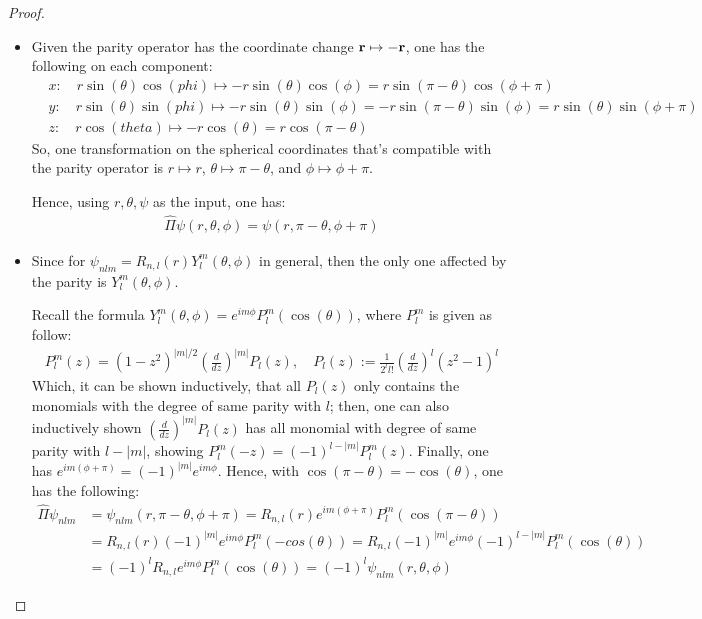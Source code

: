 \documentclass{article}
\begin{document}
\begin{proof}
    
    \hfil

    \begin{itemize}
        \item[(a)] Given the parity operator has the coordinate change $\mathbf{r} \mapsto -\mathbf{r}$, one has the following on each component:
        \begin{align}
            &x: \quad r\sin(\theta)\cos(phi) \mapsto -r\sin(\theta)\cos(\phi) = r\sin(\pi-\theta)\cos(\phi+\pi)\\
            &y: \quad r\sin(\theta)\sin(phi) \mapsto -r\sin(\theta)\sin(\phi) = -r\sin(\pi-\theta)\sin(\phi) = r\sin(\theta)\sin(\phi+\pi)\\
            &z:\quad r\cos(theta) \mapsto -r\cos(\theta) = r\cos(\pi-\theta)
        \end{align}
        So, one transformation on the spherical coordinates that's compatible with the parity operator is $r\mapsto r$, $\theta\mapsto \pi-\theta$, and $\phi\mapsto \phi+\pi$.

        Hence, using $r,\theta,\psi$ as the input, one has:
        \begin{align}
            \hat{\Pi}\psi(r,\theta,\phi) = \psi(r,\pi-\theta, \phi+\pi)
        \end{align}

        \hfil

        \item[(b)] Since for $\psi_{nlm} = R_{n,l} (r) Y^m_l (\theta,\phi)$ in general, then the only one affected by the parity is $Y^m_l(\theta,\phi)$. 
        
        Recall the formula $Y^m_l(\theta,\phi) = e^{im\phi}P^m_l (\cos(\theta))$, where $P^m_l$ is given as follow:
        \begin{align}
            P^m_l (z)=(1-z^2)^{|m|/2}\left(\frac{d}{dz}\right)^{|m|}P_l (z), \quad P_l (z) := \frac{1}{2^l l!}\left(\frac{d}{dz}\right)^l (z^2-1)^l
        \end{align}
        Which, it can be shown inductively, that all $P_l (z)$ only contains the monomials with the degree of same parity with $l$; then, one can also inductively shown $\left(\frac{d}{dz}\right)^{|m|}P_l (z)$ has all monomial with degree of same parity with $l-|m|$, showing $P^m_l (-z) = (-1)^{l-|m|}P^m_l (z)$. Finally, one has $e^{im(\phi+\pi)} = (-1)^{|m|}e^{im\phi}$. Hence, with $\cos(\pi-\theta) = -\cos(\theta)$, one has the following:
        \begin{align}
            \hat{\Pi}\psi_{nlm} &= \psi_{nlm}(r,\pi-\theta, \phi+\pi) = R_{n,l}(r)e^{im(\phi+\pi)}P^m_l (\cos(\pi-\theta))\\
            &= R_{n,l}(r)(-1)^{|m|}e^{im\phi}P^m_l (-cos(\theta))= R_{n,l} (-1)^{|m|}e^{im\phi}(-1)^{l-|m|}P^m_l (\cos(\theta))\\
            &= (-1)^l R_{n,l}e^{im\phi}P^m_l (\cos(\theta))= (-1)^l\psi_{nlm}(r,\theta,\phi)
        \end{align} 
    \end{itemize}
\end{proof}
\end{document}
